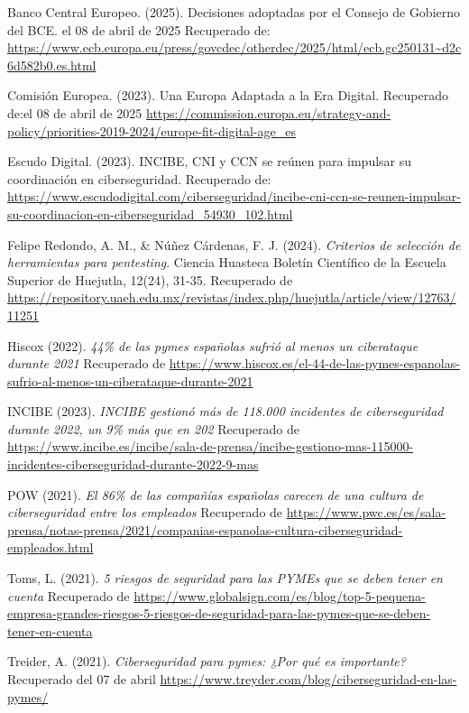 \documentclass[a4paper, 10pt]{article}
\begin{document}
\begin{thebibliography}{20}
    Banco Central Europeo. (2025). Decisiones adoptadas por el Consejo de Gobierno del BCE. el 08 de abril de 2025 Recuperado de: \url{https://www.ecb.europa.eu/press/govcdec/otherdec/2025/html/ecb.gc250131~d2c6d582b0.es.html}

    Comisión Europea. (2023). Una Europa Adaptada a la Era Digital. Recuperado de:el 08 de abril de 2025  \url{https://commission.europa.eu/strategy-and-policy/priorities-2019-2024/europe-fit-digital-age_es}

    Escudo Digital. (2023). INCIBE, CNI y CCN se reúnen para impulsar su coordinación en ciberseguridad. Recuperado de: \url{https://www.escudodigital.com/ciberseguridad/incibe-cni-ccn-se-reunen-impulsar-su-coordinacion-en-ciberseguridad_54930_102.html}

    Felipe Redondo, A. M., \& Núñez Cárdenas, F. J. (2024). \textit{Criterios de selección de herramientas para pentesting}. Ciencia Huasteca Boletín Científico de la Escuela Superior de Huejutla, 12(24), 31-35. Recuperado de \url{https://repository.uaeh.edu.mx/revistas/index.php/huejutla/article/view/12763/11251}
    
    Hiscox (2022). \textit{ 44\% de las pymes españolas sufrió al menos un ciberataque durante 2021} Recuperado de \url{https://www.hiscox.es/el-44-de-las-pymes-espanolas-sufrio-al-menos-un-ciberataque-durante-2021}

    INCIBE (2023). \textit{INCIBE gestionó más de 118.000 incidentes de ciberseguridad durante 2022, un 9\% más que en 202} Recuperado de \url{https://www.incibe.es/incibe/sala-de-prensa/incibe-gestiono-mas-115000-incidentes-ciberseguridad-durante-2022-9-mas}

    POW (2021). \textit{El 86\% de las compañías españolas carecen de una cultura de ciberseguridad entre los empleados} Recuperado de \url{https://www.pwc.es/es/sala-prensa/notas-prensa/2021/companias-espanolas-cultura-ciberseguridad-empleados.html}

    Toms, L. (2021). \textit{5 riesgos de seguridad para las PYMEs que se deben tener en cuenta} Recuperado de \url{https://www.globalsign.com/es/blog/top-5-pequena-empresa-grandes-riesgos-5-riesgos-de-seguridad-para-las-pymes-que-se-deben-tener-en-cuenta}
    
    Treider, A. (2021). \textit{Ciberseguridad para pymes: ¿Por qué es importante?} Recuperado del 07 de abril \url{https://www.treyder.com/blog/ciberseguridad-en-las-pymes/}
\end{thebibliography}
\end{document}
